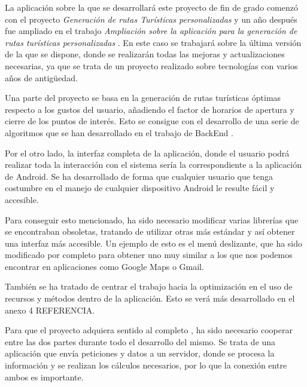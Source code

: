 
La aplicación sobre la que se desarrollará este proyecto de fin de grado comenzó con el proyecto \textit{Generación de rutas Turísticas personalizadas} \cite{tfg1} y un año después fue ampliado en el trabajo \textit{Ampliación sobre la aplicación para la generación de rutas turísticas personalizadas} \cite{tfm1}. En este caso se trabajará sobre la última versión de la que se dispone, donde se realizarán todas las mejoras y actualizaciones necesarias, ya que se trata de un proyecto realizado sobre tecnologías con varios años de antigüedad.

Una parte del proyecto se basa en la generación de rutas turísticas óptimas respecto a los gustos del usuario, añadiendo el factor de horarios de apertura y cierre de los puntos de interés. Esto se consigue con el desarrollo de una serie de algoritmos que se han desarrollado en el trabajo de BackEnd \cite{tfg2}.

Por el otro lado, la interfaz completa de la aplicación, donde el usuario podrá realizar toda la interacción con el sistema sería la correspondiente a la aplicación de Android. Se ha desarrollado de forma que cualquier usuario que tenga costumbre en el manejo de cualquier dispositivo Android le resulte fácil y accesible.

Para conseguir esto mencionado, ha sido necesario modificar varias librerías que se encontraban obsoletas, tratando de utilizar otras más estándar y así obtener una interfaz más accesible. Un ejemplo de esto es el menú deslizante, que ha sido modificado por completo para obtener uno muy similar a los que nos podemos encontrar en aplicaciones como Google Maps o Gmail.

También se ha tratado de centrar el trabajo hacia la optimización en el uso de recursos y métodos dentro de la aplicación. Esto se verá más desarrollado en el anexo 4 REFERENCIA.

Para que el proyecto adquiera sentido al completo , ha sido necesario cooperar entre las dos partes durante todo el desarrollo del mismo. Se trata de una aplicación que envía peticiones y datos a un servidor, donde se procesa la información y se realizan los cálculos necesarios, por lo que la conexión entre ambos es importante.

